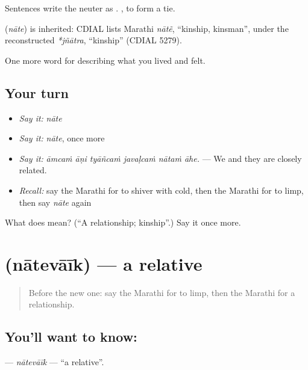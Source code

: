 Sentences write the neuter as .  , to form a tie.

\begin{cousinweb}
\textbf{} (\emph{nāte}) is inherited: CDIAL lists Marathi \emph{nātẽ}, \textquotedblleft{}kinship, kinsman\textquotedblright{}, under the reconstructed \emph{*jñātra}, \textquotedblleft{}kinship\textquotedblright{} (CDIAL 5279).
\end{cousinweb}

\begin{grammarlens}[title={What you've built}]
One more word for describing what you lived and felt.
\end{grammarlens}

\subsection*{Your turn}
\begin{itemize}
\raggedright
  \item \emph{Say it:} \emph{nāte}
  \item \emph{Say it:} \emph{nāte}, once more
  \item \emph{Say it:} \emph{āmcaṁ āṇi tyāñcaṁ javaḷcaṁ nātaṁ āhe.} — We and they are closely related.
  \item \emph{Recall:} say the Marathi for to shiver with cold, then the Marathi for to limp, then say \emph{nāte} again
\end{itemize}

\begin{tcolorbox}[breakable,colback=teal!4,colframe=teal!35!black,title={Before you move on}]
What does  mean? (\textquotedblleft{}A relationship; kinship\textquotedblright{}.) Say it once more.
\end{tcolorbox}
\section[\texorpdfstring{\mr{नातेवाईक} (nātevāīk)}{नातेवाईक (nātevāīk)}]{ (nātevāīk) — a relative}

\label{lesson:MR-C494-natevaik}



\begin{quote}
Before the new one: say the Marathi for to limp, then the Marathi for a relationship.
\end{quote}

\subsection*{You'll want to know: }
\textbf{} — \emph{nātevāīk} — \textquotedblleft{}a relative\textquotedblright{}.

